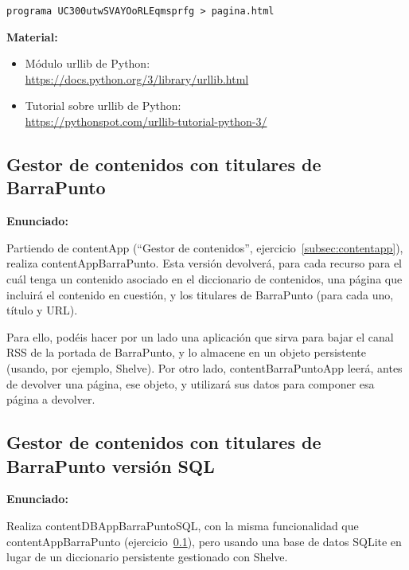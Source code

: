 \begin{verbatim}
programa UC300utwSVAYOoRLEqmsprfg > pagina.html
\end{verbatim}

\textbf{Material:}

\begin{itemize}
\item Módulo urllib de Python: \\
  \url{https://docs.python.org/3/library/urllib.html}
\item Tutorial sobre urllib de Python: \\
  \url{https://pythonspot.com/urllib-tutorial-python-3/}
\end{itemize}

\subsection{Gestor de contenidos con titulares de BarraPunto}
\label{subsec:contentapp-barrapunto}

\textbf{Enunciado:}

Partiendo de contentApp (``Gestor de contenidos'', ejercicio~\ref{subsec:contentapp}), realiza contentAppBarraPunto. Esta versión devolverá, para cada recurso para el cuál tenga un contenido asociado en el diccionario de contenidos, una página que incluirá el contenido en cuestión, y los titulares de BarraPunto (para cada uno, título y URL).

Para ello, podéis hacer por un lado una aplicación que sirva para bajar el canal RSS de la portada de BarraPunto, y lo almacene en un objeto persistente (usando, por ejemplo, Shelve). Por otro lado, contentBarraPuntoApp leerá, antes de devolver una página, ese objeto, y utilizará sus datos para componer esa página a devolver. 

\subsection{Gestor de contenidos con titulares de BarraPunto versión SQL}
\label{subsec:contentapp-barrapunto-sql}

\textbf{Enunciado:}

Realiza contentDBAppBarraPuntoSQL, con la misma funcionalidad que contentAppBarraPunto (ejercicio~\ref{subsec:contentapp-barrapunto}), pero usando una base de datos SQLite en lugar de un diccionario persistente gestionado con Shelve.

